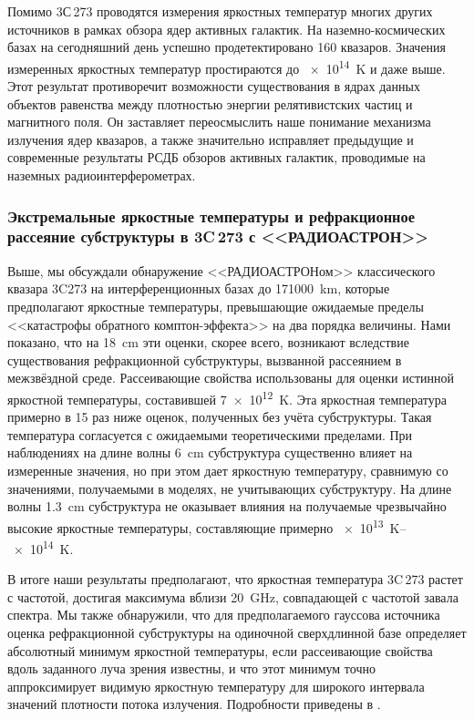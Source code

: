 Помимо 3С\,273 проводятся измерения яркостных температур многих других источников в рамках обзора
ядер активных галактик. На наземно-космических базах на сегодняшний день успешно продетектировано
160 квазаров. Значения измеренных яркостных температур простираются до \SI{e14}{\kelvin} и даже
выше. Этот результат противоречит возможности существования в ядрах данных объектов равенства между
плотностью энергии релятивистских частиц и магнитного поля. Он заставляет переосмыслить наше
понимание механизма излучения ядер квазаров, а также значительно исправляет предыдущие и современные
результаты РСДБ обзоров активных галактик, проводимые на наземных радиоинтерферометрах.

\subsubsection{Экстремальные яркостные температуры и рефракционное рассеяние субструктуры в 3C\,273
с <<РАДИОАСТРОН>>}

Выше, мы обсуждали обнаружение <<РАДИОАСТРОНом>> классического квазара 3C273 на интерференционных
базах до \SI{171000}{\km}, которые предполагают яркостные температуры, превышающие ожидаемые пределы
<<катастрофы обратного комптон-эффекта>> на два порядка величины. Нами показано, что на \SI{18}{\cm}
эти оценки, скорее всего, возникают вследствие существования рефракционной субструктуры, вызванной
рассеянием в межзвёздной среде. Рассеивающие свойства использованы для оценки истинной яркостной
температуры, составившей \SI{7e12}{\kelvin}. Эта яркостная температура примерно в 15 раз ниже
оценок, полученных без учёта субструктуры. Такая температура согласуется с ожидаемыми теоретическими
пределами. При наблюдениях на длине волны \SI{6}{\cm} субструктура существенно влияет на измеренные
значения, но при этом дает яркостную температуру, сравнимую со значениями, получаемыми в моделях, не
учитывающих субструктуру. На длине волны \SI{1.3}{\cm} субструктура не оказывает влияния на
получаемые чрезвычайно высокие яркостные температуры, составляющие примерно
\SIrange{e13}{e14}{\kelvin}.

В итоге наши результаты предполагают, что яркостная температура 3C\,273 растет с частотой, достигая
максимума вблизи \SI{20}{\GHz}, совпадающей с частотой завала спектра. Мы также обнаружили, что для
предполагаемого гауссова источника оценка рефракционной субструктуры на одиночной сверхдлинной базе
определяет абсолютный минимум яркостной температуры, если рассеивающие свойства вдоль заданного луча
зрения известны, и что этот минимум точно аппроксимирует видимую яркостную температуру для широкого
интервала значений плотности потока излучения. Подробности приведены в \cite{Johnson_2016}.

